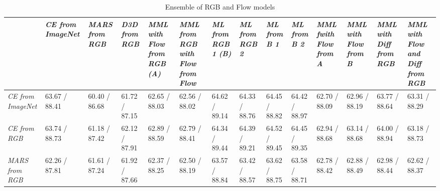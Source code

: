 \documentclass[conference]{IEEEtran}
\begin{document}
\begin{table*}[!h]
	\centering
	\caption{Ensemble of RGB and Flow models}
	\label{tab:rgbflow}
	\centering
	\begin{tabular}{|p{}|p{}|p{}|p{}|p{}|p{}|p{}|p{}|p{}|p{}|p{}|p{}|p{}|p{}|}
		\hline \diagbox[innerwidth=0.06\textwidth]{Flow}{RGB} & \it CE from ImageNet & \it MARS from RGB & \it D3D from RGB & \it MML with Flow from RGB (\textbf{A}) & \it MML from RGB with Flow from Flow & \it ML from RGB 1 (\textbf{B}) & \it ML from RGB 2 & \it ML from \textbf{B} 1 & \it ML from \textbf{B} 2 & \it MML fwith Flow from \textbf{A} & \it MML with Flow from \textbf{B} & \it MML with Diff from RGB & \it MML with Flow and Diff from RGB \\ \hline
		\it CE from ImageNet & \cellcolor[RGB]{255,255,255} 63.67 / 88.41 & \cellcolor[RGB]{91,155,213} 60.40 / 86.68 & \cellcolor[RGB]{157,195,230} 61.72 / 87.15 & \cellcolor[RGB]{204,224,242} 62.65 / 88.03 & \cellcolor[RGB]{199,221,241} 62.56 / 88.02 & \cellcolor[RGB]{255,149,149} 64.62 / 89.14 & \cellcolor[RGB]{255,181,181} 64.33 / 88.76 & \cellcolor[RGB]{255,168,168} 64.45 / 88.82 & \cellcolor[RGB]{255,171,171} 64.42 / 88.97 & \cellcolor[RGB]{206,225,243} 62.70 / 88.09 & \cellcolor[RGB]{219,233,246} 62.96 / 88.19 & \cellcolor[RGB]{255,244,244} 63.77 / 88.64 & \cellcolor[RGB]{237,244,250} 63.31 / 88.29 \\ \hline 
		\it CE from RGB & \cellcolor[RGB]{255,247,247} 63.74 / 88.73 & \cellcolor[RGB]{130,179,223} 61.18 / 87.42 & \cellcolor[RGB]{177,208,235} 62.12 / 87.91 & \cellcolor[RGB]{216,231,245} 62.89 / 88.59 & \cellcolor[RGB]{211,228,244} 62.79 / 88.41 & \cellcolor[RGB]{255,180,180} 64.34 / 89.44 & \cellcolor[RGB]{255,175,175} 64.39 / 89.21 & \cellcolor[RGB]{255,160,160} 64.52 / 89.45 & \cellcolor[RGB]{255,168,168} 64.45 / 89.35 & \cellcolor[RGB]{218,233,246} 62.94 / 88.68 & \cellcolor[RGB]{228,239,248} 63.14 / 88.68 & \cellcolor[RGB]{255,218,218} 64.00 / 88.94 & \cellcolor[RGB]{230,240,249} 63.18 / 88.73 \\ \hline 
		\it MARS from RGB & \cellcolor[RGB]{184,212,237} 62.26 / 87.81 & \cellcolor[RGB]{152,192,229} 61.61 / 87.24 & \cellcolor[RGB]{167,201,233} 61.92 / 87.66 & \cellcolor[RGB]{190,215,238} 62.37 / 88.25 & \cellcolor[RGB]{196,219,240} 62.50 / 88.19 & \cellcolor[RGB]{250,252,254} 63.57 / 88.84 & \cellcolor[RGB]{242,247,252} 63.42 / 88.57 & \cellcolor[RGB]{252,253,254} 63.62 / 88.75 & \cellcolor[RGB]{250,252,254} 63.58 / 88.71 & \cellcolor[RGB]{210,228,244} 62.78 / 88.42 & \cellcolor[RGB]{215,231,245} 62.88 / 88.49 & \cellcolor[RGB]{220,234,246} 62.98 / 88.44 & \cellcolor[RGB]{202,223,242} 62.62 / 88.37 \\ \hline 

\end{tabular}
\end{table*}
\end{document}
